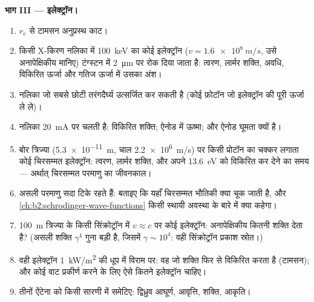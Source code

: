 \begin{problem}[{सप्ताहांत समस्या --- तीन ऐंटेना: कोई प्रसारण
मीनार, धूप में हवा का कोई अणु, और कोई मुक्त इलेक्ट्रॉन}]
\medskip
\noindent\textbf{भाग III --- इलेक्ट्रॉन।}
\begin{enumerate}[resume]
  \item $r_e$ से टामसन अनुप्रस्थ काट।
  \item किसी X-किरण नलिका में \qty{100}{keV} का कोई इलेक्ट्रॉन ($v = \qty{1.6e8}{m/s}$,
        उसे अनापेक्षिकीय मानिए) टंग्स्टन में \qty{2}{\micro m} पर रोक दिया
        जाता है: त्वरण, लार्मर शक्ति, अवधि, विकिरित ऊर्जा
        और गतिज ऊर्जा में उसका अंश।
  \item नलिका जो सबसे छोटी तरंगदैर्घ्य उत्सर्जित कर सकती है (कोई फ़ोटॉन
        जो इलेक्ट्रॉन की पूरी ऊर्जा ले ले)।
  \item नलिका \qty{20}{mA} पर चलती है: विकिरित शक्ति; ऐनोड में ऊष्मा;
        और ऐनोड घूमता क्यों है।
  \item बोर त्रिज्या (\qty{5.3e-11}{m}, चाल \qty{2.2e6}{m/s}) पर किसी प्रोटॉन का
        चक्कर लगाता कोई चिरसम्मत इलेक्ट्रॉन: त्वरण, लार्मर
        शक्ति, और अपने \qty{13.6}{eV} को विकिरित कर देने का समय --- अर्थात्
        चिरसम्मत परमाणु का जीवनकाल।
  \item असली परमाणु सदा टिके रहते हैं: बताइए कि यहाँ चिरसम्मत भौतिकी
        क्या चूक जाती है, और \cref{ch:b2:schrodinger-wave-functions}
        किसी स्थायी अवस्था के बारे में क्या कहेगा।
  \item \qty{100}{m} त्रिज्या के किसी सिंक्रोट्रॉन में $v \approx c$ पर कोई इलेक्ट्रॉन:
        अनापेक्षिकीय  कितनी शक्ति देता है? (असली
        शक्ति $\gamma^4$ गुना बड़ी है, जिसमें $\gamma \sim 10^4$: वही
        सिंक्रोट्रॉन प्रकाश स्रोत।)
  \item वही इलेक्ट्रॉन \qty{1}{kW/m^2} की धूप में विराम पर: वह जो
        शक्ति फिर से विकिरित करता है (टामसन); और कोई वाट प्रकीर्ण
        करने के लिए ऐसे कितने इलेक्ट्रॉन चाहिए।
  \item तीनों ऐंटेना को किसी सारणी में समेटिए: द्विध्रुव आघूर्ण,
        आवृत्ति, शक्ति, आकृति।
\end{enumerate}
\end{problem}
